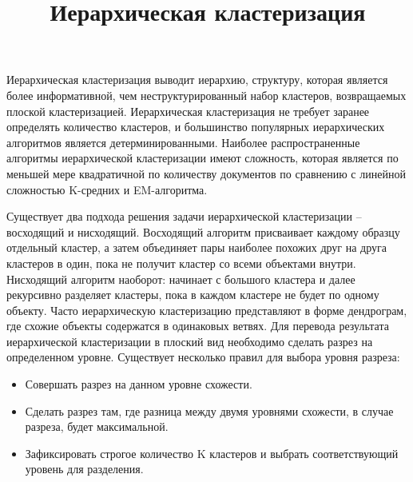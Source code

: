 \documentclass[12pt, a4paper]{article}
\title{Иерархическая кластеризация}
\begin{document}
\maketitle
Иерархическая кластеризация выводит иерархию, структуру, которая является более информативной, чем неструктурированный набор кластеров, возвращаемых плоской кластеризацией. Иерархическая кластеризация не требует заранее определять количество кластеров, и большинство популярных иерархических алгоритмов является детерминированными. Наиболее распространенные алгоритмы иерархической кластеризации имеют сложность, которая является по меньшей мере квадратичной по количеству документов по сравнению с линейной сложностью K-средних и EM-алгоритма.

Существует два подхода решения задачи иерархической кластеризации – восходящий и нисходящий. Восходящий алгоритм присваивает каждому образцу отдельный кластер, 
а затем объединяет пары наиболее похожих друг на друга кластеров в один, пока не получит кластер со всеми объектами внутри. Нисходящий алгоритм наоборот: 
начинает с большого кластера и далее рекурсивно разделяет кластеры, пока в каждом кластере не будет по одному объекту.
Часто иерархическую кластеризацию представляют в форме дендрограм, 
где схожие объекты содержатся в одинаковых ветвях. Для перевода результата иерархической кластеризации в плоский вид необходимо сделать разрез на определенном уровне. Существует несколько правил для выбора уровня разреза:

\begin{itemize}
\item Совершать разрез на данном уровне схожести.
\item Сделать разрез там, где разница между двумя уровнями схожести, в случае разреза, будет максимальной.
\item Зафиксировать строгое количество K кластеров и выбрать соответствующий уровень для разделения.
\end{itemize}
   
\end{document}
